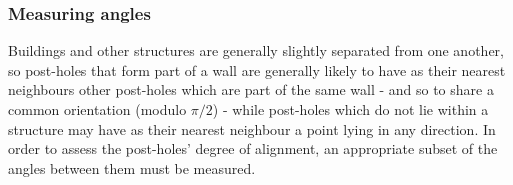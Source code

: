\documentclass[../../ArchStats.tex]{subfiles}
\begin{document}


\subsubsection{Measuring angles}

Buildings and other structures are generally slightly separated from one another, so post-holes that form part of a wall are generally likely to have as their nearest neighbours other post-holes which are part of the same wall - and so to share a common orientation (modulo $\pi/2$) - while post-holes which do not lie within a structure may have as their nearest neighbour a point lying in any direction. In order to assess the post-holes' degree of alignment, an appropriate subset of the angles between them must be measured.
\end{document}
